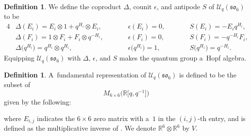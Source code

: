 \documentclass[pdftex]{sigma}
\numberwithin{equation}{section}
\theoremstyle{definition}
\newtheorem{Definition}[Theorem]{Definition}
\begin{document}
\begin{Definition} \label{definition--coproduct}
 We define the coproduct $\Delta$, counit $\epsilon$, and antipode $S$ of $\mathcal{U}_q(\mathfrak{so}_6)$ to be
 \begin{alignat*}{4}
 &\Delta (E_i) = E_i \otimes 1 + q^{H_i} \otimes E_i, \qquad &&\epsilon(E_i) = 0, \qquad&& S(E_i) = -E_iq^{H_i},& \\
 &\Delta(F_i) = 1 \otimes F_i + F_i \otimes q^{-H_i}, \qquad&& \epsilon(F_i) = 0,\qquad&& S(F_i) = -q^{-H_i}F_i,& \\
 &\Delta\bigl(q^{H_i}\bigr) = q^{H_i} \otimes q^{H_i},\qquad&& \epsilon\bigl(q^{H_i}\bigr) = 1,\qquad&&
 S\bigl(q^{H_i}\bigr) = q^{-H_i}.&
 \end{alignat*}
 Equipping $\mathcal{U}_q(\mathfrak{so}_6)$ with $\Delta$, $\epsilon$, and $S$ makes the quantum group a~Hopf algebra.
\end{Definition}

\begin{Definition} \label{definition-fundrep}
 A~fundamental representation of $\mathcal{U}_q(\mathfrak{so}_6)$ is defined to be the subset of
 \[M_{6 \times 6}\bigl(\mathbb{R}\bigl[q, q^{-1}\bigr]\bigr)\]
 given by the following:\vspace{-2mm}

\begin{center} \renewcommand{\arraystretch}{1.2}
 \end{center}

\noindent
where $E_{i,j}$ indicates the $6\times 6$ zero matrix with a~$1$ in the $(i,j)$-th entry, and  is defined as the multiplicative inverse of . We denote $\mathbb{R}^6 \otimes \mathbb{R}^6$ by $V$.
\end{Definition}
\end{document}
